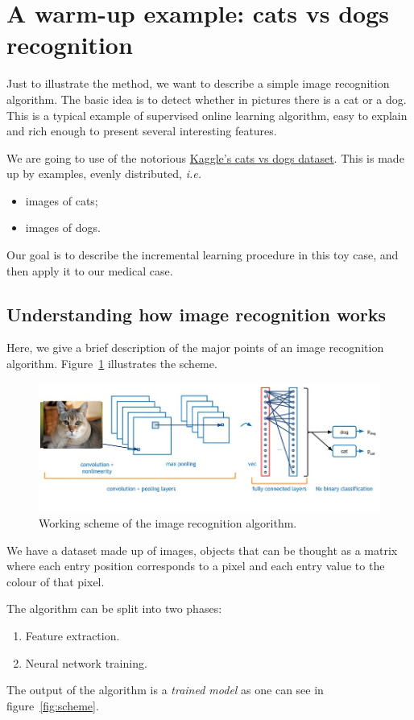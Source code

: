 \documentclass[a4paper, 10pt, superscriptaddress, nofootinbib, showkeys, notitlepage]{revtex4-1}
\begin{document}
\section{A warm-up example: cats vs dogs recognition}
	Just to illustrate the method, we want to describe a simple image recognition algorithm. 
	The basic idea is to detect whether in pictures there is a cat or a dog.
	This is a typical example of supervised online learning algorithm, easy to explain and rich enough to present several interesting features. 
	
	We are going to use of the notorious \href{https://www.kaggle.com/c/dogs-vs-cats}{Kaggle's cats vs dogs dataset}.
	This is made up by  examples, evenly distributed, \emph{i.e.}
		\begin{itemize}
			\item[]  images of cats;
			\item[]  images of dogs.
		\end{itemize}
	Our goal is to describe the incremental learning procedure in this toy case, and then apply it to our medical case.
\subsection{Understanding how image recognition works}
	Here, we give a brief description of the major points of an image recognition algorithm.
	Figure~\ref{fig:cat-vs-dog} illustrates the scheme.
		\begin{figure}[h]
  			\includegraphics[width=.7\linewidth]{Images/cat-vs-dog.jpg}
 			\caption{Working scheme of the image recognition algorithm.}
 			\label{fig:cat-vs-dog}
		\end{figure}
	We have a dataset made up of images, objects that can be thought as a matrix where each entry position corresponds to a pixel and each entry value to the colour of that pixel.
	
	The algorithm can be split into two phases:
		\begin{enumerate}
			\item Feature extraction.
			\item Neural network training.
		\end{enumerate}
	The output of the algorithm is a \emph{trained model} as one can see in figure~\ref{fig:scheme}.
	
\end{document}
